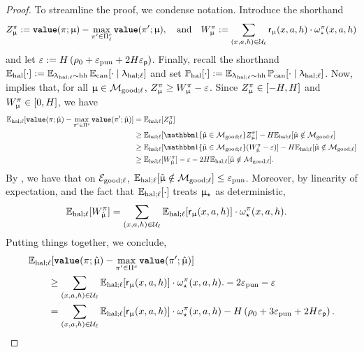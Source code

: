 	\begin{proof}		To streamline the proof, we condense notation. Introduce the shorthand
		\begin{align*}
		Z^{\pi}_{\upmu} := {\normalfont \texttt{\textbf{value}}}(\pi;\upmu) - \max_{\pi' \in \Pi_{\ell}^c}{\normalfont \texttt{\textbf{value}}}(\pi';\upmu) , \quad \text{and} \quad W^{\pi}_{\upmu} := \sum_{(x,a,h) \in \mathcal{U}_{\ell}}\mathsf{r}_{\upmu}(x,a,h) \cdot \omega_{\star}^{\pi}(x,a,h)
		\end{align*}
		 and let $\varepsilon := H \left(\rho_0 + \varepsilon_{\mathrm{pun}}  + 2H\varepsilon_{\mathsf{p}}\right)$. Finally, recall the shorthand $\Exp_{\mathrm{hal}}[\cdot] := \Expsimhh \Expcan[\cdot \mid \ledhall]$ and set $\Pr_{\mathrm{hal}}[\cdot] := \Expsimhh \Prcan[\cdot \mid \ledhall]$. Now,  implies that, for all $\upmu \in \mathcal{M}_{\mathrm{good};\ell}$, $Z^{\pi}_{\upmu} \ge W^{\pi}_{\upmu} - \varepsilon$.  Since $Z^{\pi}_{\upmu} \in [-H,H]$ and $W^{\pi}_{\upmu} \in [0,H]$, we have
		\begin{align*}
		\Exphall[\valuef{\pi}{\modvarhat} - \max_{\pi' \in  \Pi^c} \valuef{\pi'}{\modvarhat} ] &= \Exphall[ Z^{\pi}_{\modvarhat} ]\\
		&\ge \Exphall[ \ind\{\modvarhat \in \modgoodl \} Z^{\pi}_{\modvarhat}  ] - H \Exphall[ \modvarhat \notin \modgoodl ] \\
		&\ge \Exphall[ \ind\{\modvarhat \in \modgoodl \} (W^{\pi}_{\modvarhat} - \varepsilon)  ] - H \Exphall[ \modvarhat \notin \modgoodl    ] \\
		&\ge \Exphall[  W^{\pi}_{\modvarhat} ] - \varepsilon - 2H \Exphall[ \modvarhat \notin \modgoodl  ].
		\end{align*}
		By , we have that on $\mathcal{E}_{\mathrm{good};\ell}$, $\mathbb{E}_{\mathrm{hal};\ell}[ \hat{\upmu} \notin \mathcal{M}_{\mathrm{good};\ell}  ] \le \varepsilon_{\mathrm{pun}}$. Moreover, by linearity of expectation, and the fact that $\mathbb{E}_{\mathrm{hal};\ell}[\cdot]$ treats $\upmu_{\star}$ as deterministic,
		\begin{align*}
		\mathbb{E}_{\mathrm{hal};\ell}[  W^{\pi}_{\hat{\upmu}} ] &= \sum_{(x,a,h) \in \mathcal{U}_{\ell}} \mathbb{E}_{\mathrm{hal};\ell}[\mathsf{r}_{\upmu}(x,a,h)] \cdot \omega_{\star}^{\pi}(x,a,h).
		\end{align*}
		Putting things together, we conclude,
		\begin{align*}
		&\Exphall[\valuef{\pi}{\modvarhat} - \max_{\pi' \in  \Pi^c} \valuef{\pi'}{\modvarhat} ] \\
		&\qquad\ge\sum_{(x,a,h) \in \calU_{\ell}} \Exphall[\sfr_{\model}\xah] \cdot \omegast^{\pi}\xah.  - 2\epspunish - \varepsilon \\
		&\qquad= \sum_{(x,a,h) \in \calU_{\ell}} \Exphall[\sfr_{\model}\xah] \cdot \omegast^{\pi}\xah  - H \left(\rho_0 + 3\epspunish  + 2H\epsp\right).

\end{align*}
\end{proof}
